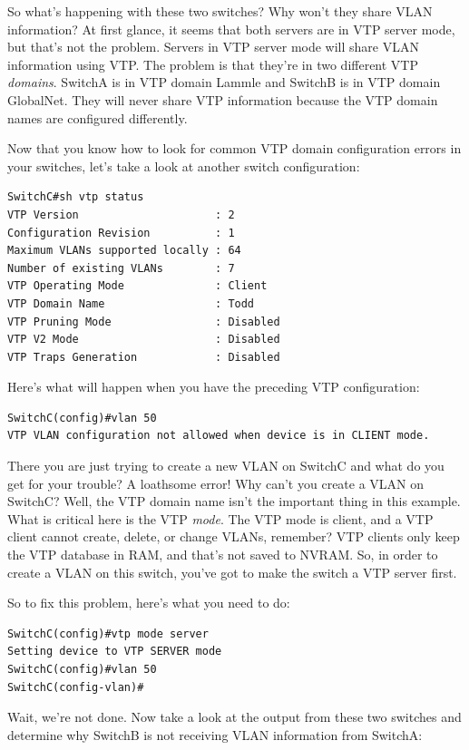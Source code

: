 \documentclass[b5paper,11pt]{memoir}
\begin{document}
So what's happening with these two switches? Why won't they share VLAN
information? At first glance, it seems that both servers are in VTP
server mode, but that's not the problem. Servers in VTP server mode will
share VLAN information using VTP. The problem is that they're in two
different VTP \emph{domains}. SwitchA is in VTP domain Lammle and SwitchB
is in VTP domain GlobalNet. They will never share VTP information
because the VTP domain names are configured differently.

Now that you know how to look for common VTP domain configuration errors
in your switches, let's take a look at another switch configuration:

\begin{verbatim}
SwitchC#sh vtp status
VTP Version                     : 2
Configuration Revision          : 1
Maximum VLANs supported locally : 64
Number of existing VLANs        : 7
VTP Operating Mode              : Client
VTP Domain Name                 : Todd
VTP Pruning Mode                : Disabled
VTP V2 Mode                     : Disabled
VTP Traps Generation            : Disabled
\end{verbatim}

Here's what will happen when you have the preceding VTP configuration:

\begin{verbatim}
SwitchC(config)#vlan 50
VTP VLAN configuration not allowed when device is in CLIENT mode.
\end{verbatim}

There you are just
trying to create a new VLAN on SwitchC and what do you get for your
trouble? A loathsome error! Why can't you create a VLAN on SwitchC?
Well, the VTP domain name isn't the important thing in this example.
What is critical here is the VTP \emph{mode}. The VTP mode is client,
and a VTP client cannot create, delete, or change VLANs, remember? VTP
clients only keep the VTP database in RAM, and that's not saved to
NVRAM. So, in order to create a VLAN on this switch, you've got to make
the switch a VTP server first.

So to fix this problem, here's what you need to do:

\begin{verbatim}
SwitchC(config)#vtp mode server
Setting device to VTP SERVER mode
SwitchC(config)#vlan 50
SwitchC(config-vlan)#
\end{verbatim}

Wait, we're not done. Now take a look at the output from these two
switches and determine why SwitchB is not receiving VLAN information
from SwitchA:
\end{document}
